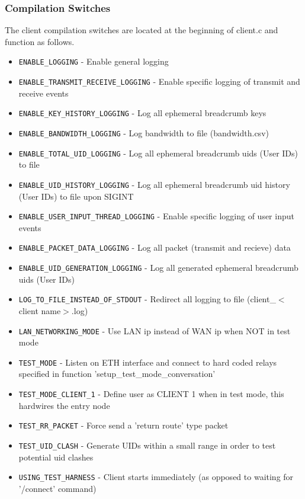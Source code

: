 \documentclass{article}
\begin{document}
\subsubsection{Compilation Switches}
The client compilation switches are located at the beginning of client.c and function as follows.
\begin{itemize}
	\item \texttt{ENABLE\_LOGGING} - Enable general logging
	\item \texttt{ENABLE\_TRANSMIT\_RECEIVE\_LOGGING} - Enable specific logging of transmit and receive events
	\item \texttt{ENABLE\_KEY\_HISTORY\_LOGGING} - Log all ephemeral breadcrumb keys
	\item \texttt{ENABLE\_BANDWIDTH\_LOGGING} - Log bandwidth to file (bandwidth.csv)
	\item \texttt{ENABLE\_TOTAL\_UID\_LOGGING} - Log all ephemeral breadcrumb uids (User IDs) to file
	\item \texttt{ENABLE\_UID\_HISTORY\_LOGGING} - Log all ephemeral breadcrumb uid history (User IDs) to file upon SIGINT
	\item \texttt{ENABLE\_USER\_INPUT\_THREAD\_LOGGING} - Enable specific logging of user input events
	\item \texttt{ENABLE\_PACKET\_DATA\_LOGGING} - Log all packet (transmit and recieve) data
	\item \texttt{ENABLE\_UID\_GENERATION\_LOGGING} - Log all generated ephemeral breadcrumb uids (User IDs)
	\item \texttt{LOG\_TO\_FILE\_INSTEAD\_OF\_STDOUT} - Redirect all logging to file (client\_$<$client name$>$.log)
	\item \texttt{LAN\_NETWORKING\_MODE} - Use LAN ip instead of WAN ip when NOT in test mode
	\item \texttt{TEST\_MODE} - Listen on ETH interface and connect to hard coded relays specified in function 'setup\_test\_mode\_conversation'
	\item \texttt{TEST\_MODE\_CLIENT\_1} - Define user as CLIENT 1 when in test mode, this hardwires the entry node
	\item \texttt{TEST\_RR\_PACKET} - Force send a 'return route' type packet
	\item \texttt{TEST\_UID\_CLASH} - Generate UIDs within a small range in order to test potential uid clashes
	\item \texttt{USING\_TEST\_HARNESS} - Client starts immediately (as opposed to waiting for '/connect' command)
\end{itemize}
\end{document}
